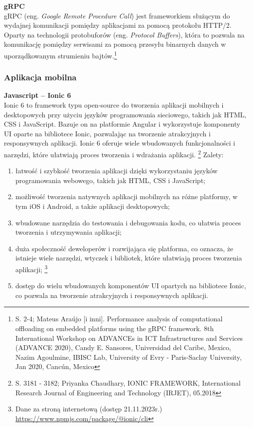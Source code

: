 \documentclass[12pt, a4paper, twoside, openany]{book}
\newcommand{\forceindent}{\leavevmode{\parindent=1.3em\indent}}
\begin{document}
\forceindent \textbf{gRPC\\}
\forceindent gRPC (eng. \textit{Google Remote Procedure Call}) jest frameworkiem służącym do wydajnej komunikacji pomiędzy aplikacjami za pomocą protokołu HTTP/2. Oparty na technologii protobuforów (eng. \textit{Protocol Buffers}), która to pozwala na komunikację pomiędzy serwisami za pomocą przesyłu binarnych danych w uporządkowanym strumieniu bajtów.\footnote{S. 2-4; Mateus Araújo [i inni]. Performance analysis of computational offloading on embedded platforms using the gRPC framework. 8th International Workshop on ADVANCEs in ICT Infrastructures and Services (ADVANCE 2020), Candy E. Sansores, Universidad del Caribe, Mexico, Nazim Agoulmine, IBISC Lab, University of Evry - Paris-Saclay University, Jan 2020, Cancún, Mexico}

\subsubsection{Aplikacja mobilna}

\forceindent \textbf{Javascript -- Ionic 6\\}
\indent Ionic 6 to framework typu open-source do tworzenia aplikacji mobilnych i desktopowych przy użyciu języków programowania sieciowego, takich jak HTML, CSS i JavaScript. Bazuje on na platformie Angular i wykorzystuje komponenty UI oparte na bibliotece Ionic, pozwalając na tworzenie atrakcyjnych i responsywnych aplikacji. Ionic 6 oferuje wiele wbudowanych funkcjonalności i narzędzi, które ułatwiają proces tworzenia i wdrażania aplikacji. \footnote{S. 3181 - 3182; Priyanka Chaudhary, IONIC FRAMEWORK, International Research Journal of Engineering and Technology (IRJET), 05.2018}
Zalety:
\begin{enumerate}[label=--]
    \item łatwość i szybkość tworzenia aplikacji dzięki wykorzystaniu języków programowania webowego, takich jak HTML, CSS i JavaScript;
    \item możliwość tworzenia natywnych aplikacji mobilnych na różne platformy, w tym iOS i Android, a także aplikacji desktopowych;
    \item wbudowane narzędzia do testowania i debugowania kodu, co ułatwia proces tworzenia i utrzymywania aplikacji;
    \item duża społeczność deweloperów i rozwijająca się platforma, co oznacza, że istnieje wiele narzędzi, wtyczek i bibliotek, które ułatwiają proces tworzenia aplikacji; \footnote{Dane za stroną internetową (dostęp 21.11.2023r.) \url{https://www.npmjs.com/package/@ionic/cli}}
    \item dostęp do wielu wbudowanych komponentów UI opartych na bibliotece Ionic, co pozwala na tworzenie atrakcyjnych i responsywnych aplikacji.
\end{enumerate}
\end{document}
